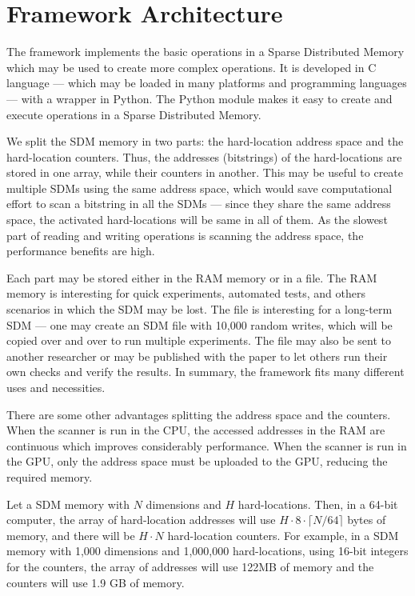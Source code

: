 


\chapter{Framework Architecture}

The framework implements the basic operations in a Sparse Distributed Memory which may be used to create more complex operations. It is developed in C language --- which may be loaded in many platforms and programming languages --- with a wrapper in Python. The Python module makes it easy to create and execute operations in a Sparse Distributed Memory.

We split the SDM memory in two parts: the hard-location address space and the hard-location counters. Thus, the addresses (bitstrings) of the hard-locations are stored in one array, while their counters in another. This may be useful to create multiple SDMs using the same address space, which would save computational effort to scan a bitstring in all the SDMs --- since they share the same address space, the activated hard-locations will be same in all of them. As the slowest part of reading and writing operations is scanning the address space, the performance benefits are high.

Each part may be stored either in the RAM memory or in a file. The RAM memory is interesting for quick experiments, automated tests, and others scenarios in which the SDM may be lost. The file is interesting for a long-term SDM --- one may create an SDM file with 10,000 random writes, which will be copied over and over to run multiple experiments. The file may also be sent to another researcher or may be published with the paper to let others run their own checks and verify the results. In summary, the framework fits many different uses and necessities.

There are some other advantages splitting the address space and the counters. When the scanner is run in the CPU, the accessed addresses in the RAM are continuous which improves considerably performance. When the scanner is run in the GPU, only the address space must be uploaded to the GPU, reducing the required memory.

Let a SDM memory with $N$ dimensions and $H$ hard-locations. Then, in a 64-bit computer, the array of hard-location addresses will use $H \cdot 8 \cdot \lceil N/64 \rceil$ bytes of memory, and there will be $H \cdot N$ hard-location counters. For example, in a SDM memory with 1,000 dimensions and 1,000,000 hard-locations, using 16-bit integers for the counters, the array of addresses will use 122MB of memory and the counters will use 1.9 GB of memory.

